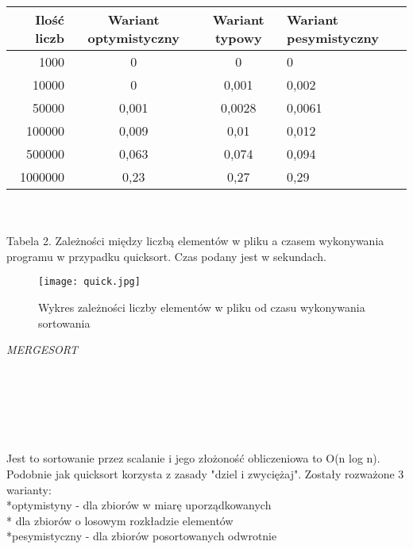 \documentclass[11pt]{article}
\begin{document}
\begin{tabular}{|r|c|c|l|}
  \hline 
  \hline
  Ilość liczb  & Wariant optymistyczny & Wariant typowy & Wariant pesymistyczny  \\
  \hline
  1000 & 0 & 0 & 0  \\
  \hline
   10000 & 0 & 0,001 & 0,002 \\
  \hline
   50000 & 0,001 & 0,0028 & 0,0061 \\
  \hline
  100000 & 0,009 & 0,01 & 0,012 \\
  \hline
   500000 & 0,063 & 0,074 & 0,094 \\
  \hline
   1000000 & 0,23 & 0,27 & 0,29 \\
  \hline
\end{tabular} 
\\ \\ Tabela 2. Zależności między liczbą elementów w pliku a czasem wykonywania programu w przypadku quicksort. Czas podany jest w sekundach.

\begin{figure}[ht!]
\centering
\texttt{[image: quick.jpg]}
\caption{Wykres zależności liczby elementów w pliku od czasu wykonywania sortowania}
\label{overflow}
\end{figure}


\textit{MERGESORT }
\\ \\ \\ \\ \\ \\ \\
Jest to sortowanie przez scalanie i jego złożoność obliczeniowa to O(n log n). Podobnie jak quicksort korzysta z zasady "dziel i zwyciężaj". Zostały rozważone 3 warianty: \\ *optymistyny - dla zbiorów w miarę uporządkowanych \\ * dla zbiorów o losowym rozkładzie elementów \\ *pesymistyczny - dla zbiorów posortowanych odwrotnie
\end{document}
